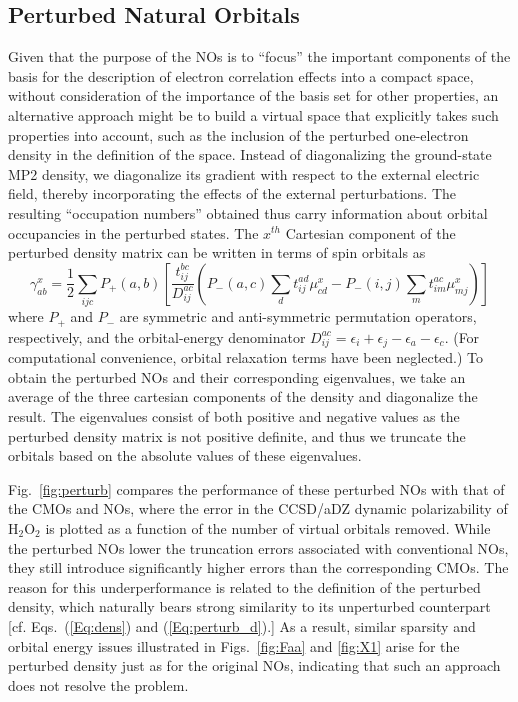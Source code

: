\documentclass[journal=jpccck,manuscript=article]{achemso}
\begin{document}
\subsection{Perturbed Natural Orbitals}

Given that the purpose of the NOs is to ``focus'' the important components of
the basis for the description of electron correlation effects into a compact
space, without consideration of the importance of the basis set for other
properties, an alternative approach might be to build a virtual space that
explicitly takes such properties into account, such as the inclusion of the
perturbed one-electron density in the definition of the space.  Instead of
diagonalizing the ground-state MP2 density, we diagonalize its gradient with
respect to the external electric field, thereby incorporating the effects of
the external perturbations.  The resulting ``occupation numbers'' obtained
thus carry information about orbital occupancies in the perturbed states.  The
$x^{th}$ Cartesian component of the perturbed density matrix can be written in
terms of spin orbitals as
\begin{equation}
\gamma^x_{ab} = \frac{1}{2}\sum_{ijc}P_{+}(a,b)\left[\frac{t^{bc}_{ij}}{D^{ac}_{ij}}\left(P_{-}(a,c)\sum_dt^{ad}_{ij}\mu^x_{cd} - P_{-}(i,j)\sum_m t^{ac}_{im}\mu^x_{mj}\right)\right]
\label{Eq:perturb_d}
\end{equation}
where $P_{+}$ and $P_{-}$ are symmetric and anti-symmetric permutation
operators, respectively, and the orbital-energy denominator $D^{ac}_{ij} =
\epsilon_i + \epsilon_j  -\epsilon_a -\epsilon_c $.  (For computational
convenience, orbital relaxation terms have been neglected.) To obtain the
perturbed NOs and their corresponding eigenvalues, we take an average of the
three cartesian components of the density and diagonalize the result.
The eigenvalues consist of both positive and negative values as the perturbed
density matrix is not positive definite, and thus we truncate the orbitals
based on the absolute values of these eigenvalues.

Fig.~\ref{fig:perturb} compares the performance of these perturbed NOs with
that of the CMOs and NOs, where the error in the CCSD/aDZ dynamic
polarizability of H$_2$O$_2$ is plotted as a function of the number of virtual
orbitals removed. While the perturbed NOs lower the truncation errors
associated with conventional NOs, they still introduce significantly higher
errors than the corresponding CMOs.  The reason for this underperformance is
related to the definition of the perturbed density, which naturally bears
strong similarity to its unperturbed counterpart [cf. Eqs.~(\ref{Eq:dens}) and
(\ref{Eq:perturb_d}).]  As a result, similar sparsity and orbital energy issues
illustrated in Figs.~\ref{fig:Faa} and \ref{fig:X1} arise for the perturbed
density just as for the original NOs, indicating that such an approach does not
resolve the problem.
\end{document}
